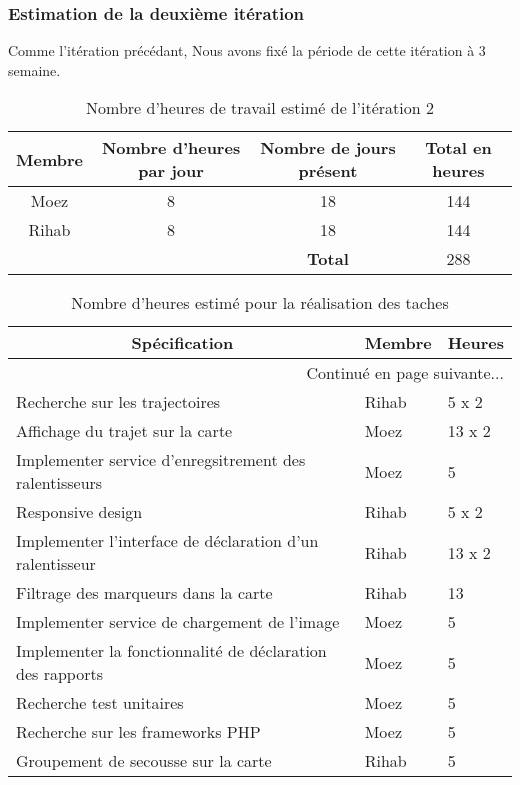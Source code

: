\subsubsection{Estimation de la deuxième itération}

Comme l'itération précédant, Nous avons fixé la période de cette itération à 3
semaine.

\begin{table}[htbp]
    \centering
    \begin{tabular}{| c | c | c | c |}
        \hline
        \textbf{Membre} & \textbf{Nombre d'heures par jour} & \textbf{Nombre de jours présent} & \textbf{Total en heures} \\ \hline
        \hline
Moez & 8 & 18& 144\\ \hline
Rihab & 8 & 18 & 144 \\ \hline
\multicolumn{2}{c|}{} & \textbf{Total} & 288 \\ \cline{3-4}
    \end{tabular}
    \caption{Nombre d'heures de travail estimé de l'itération 2}
    \label{tab:sprint2-capacity}
\end{table}

\begin{center}
    \begin{longtable}{| l | l | l |}
        \caption{Nombre d'heures estimé pour la réalisation des taches}
        \label{tab:sprint2-estimation} \\

        \hline
        \multicolumn{1}{|c}{\textbf{Spécification}} &
        \multicolumn{1}{|c}{\textbf{Membre}} &
        \multicolumn{1}{|c|}{\textbf{Heures}} \\ \hline
        \endhead

        \hline \multicolumn{3}{|r|}{{Continué en page suivante$\dotsc$}} \\ \hline
        \endfoot

        \hline \hline
        \endlastfoot

        \hline
Recherche sur les trajectoires & Rihab & 5 x 2 \\ \hline
Affichage du trajet sur la carte & Moez & 13 x 2 \\ \hline
Implementer service d’enregsitrement des ralentisseurs & Moez & 5 \\ \hline
Responsive design & Rihab & 5 x 2 \\ \hline
Implementer l’interface de déclaration d'un ralentisseur & Rihab & 13 x 2 \\ \hline
Filtrage des marqueurs dans la carte & Rihab & 13 \\ \hline
Implementer service de chargement de l'image & Moez & 5 \\ \hline
Implementer la fonctionnalité de déclaration des rapports & Moez & 5 \\ \hline
Recherche test unitaires & Moez & 5 \\ \hline
Recherche sur les frameworks PHP & Moez & 5 \\ \hline
Groupement de secousse sur la carte & Rihab & 5 \\ \hline
    \end{longtable}
\end{center}

